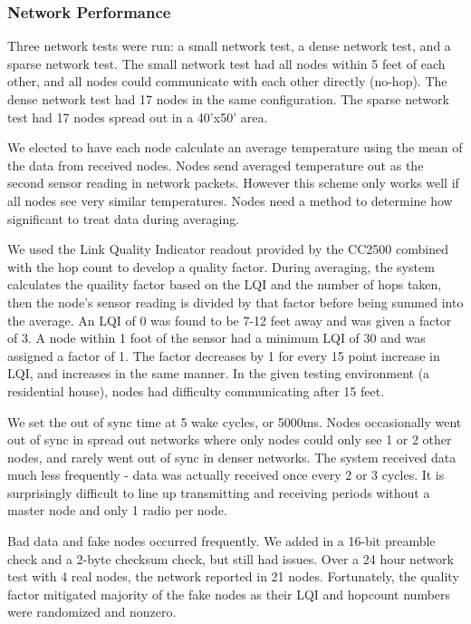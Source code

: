 \subsubsection{Network Performance} 
Three network tests were run: a small network test, a dense network test, and a sparse network test. The small network test had all nodes within 5 feet of each other, and all nodes could communicate with each other directly (no-hop). The dense network test had 17 nodes in the same configuration. The sparse network test had 17 nodes spread out in a 40'x50' area.

We elected to have each node calculate an average temperature using the mean of the data from received nodes. Nodes send averaged temperature out as the second sensor reading in network packets. However this scheme only works well if all nodes see very similar temperatures. Nodes need a method to determine how significant to treat data during averaging.

We used the Link Quality Indicator readout provided by the CC2500 combined with the hop count to develop a quality factor. During averaging, the system calculates the quaility factor based on the LQI and the number of hops taken, then the node's sensor reading is divided by that factor before being summed into the average. An LQI of 0 was found to be 7-12 feet away and was given a factor of 3. A node within 1 foot of the sensor had a minimum LQI of 30 and was assigned a factor of 1. The factor decreases by 1 for every 15 point increase in LQI, and increases in the same manner. In the given testing environment (a residential house), nodes had difficulty communicating after 15 feet.

We set the out of sync time at 5 wake cycles, or 5000ms. Nodes occasionally went out of sync in spread out networks where only nodes could only see 1 or 2 other nodes, and rarely went out of sync in denser networks. The system received data much less frequently - data was actually received once every 2 or 3 cycles. It is surprisingly difficult to line up transmitting and receiving periods without a master node and only 1 radio per node.

Bad data and fake nodes occurred frequently. We added in a 16-bit preamble check and a 2-byte checksum check, but still had issues. Over a 24 hour network test with 4 real nodes, the network reported in 21 nodes. Fortunately, the quality factor mitigated majority of the fake nodes as their LQI and hopcount numbers were randomized and nonzero.

